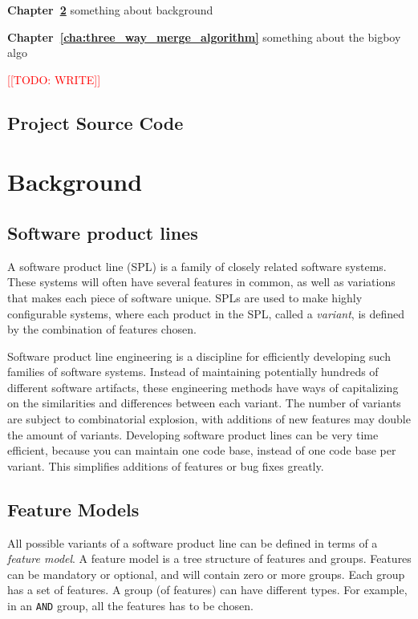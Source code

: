 \documentclass[a4paper,english]{ifimaster}
\newcommand{\todo}[1]{\textcolor{red}{[[TODO: #1]]}\PackageWarning{TODO:}{#1!}}
\begin{document}
\textbf{Chapter~\ref{cha:background}} something about background

\textbf{Chapter~\ref{cha:three_way_merge_algorithm}} something about the bigboy algo

\todo{WRITE}

\section{Project Source Code}%
\label{sec:project_source_code}

\chapter{Background}%
\label{cha:background}

\section{Software product lines}%
\label{sec:software_product_lines}

A software product line (SPL) is a family of closely related software systems. These systems will often have several features in common, as well as variations that makes each piece of software unique. SPLs are used to make highly configurable systems, where each product in the SPL, called a \textit{variant}, is defined by the combination of features chosen.

Software product line engineering is a discipline for efficiently developing such families of software systems. Instead of maintaining potentially hundreds of different software artifacts, these engineering methods have ways of capitalizing on the similarities and differences between each variant. The number of variants are subject to combinatorial explosion, with additions of new features may double the amount of variants. Developing software product lines can be very time efficient, because you can maintain one code base, instead of one code base per variant. This simplifies additions of features or bug fixes greatly.

\section{Feature Models}%
\label{sec:feature_models}

All possible variants of a software product line can be defined in terms of a \textit{feature model}. A feature model is a tree structure of features and groups. Features can be mandatory or optional, and will contain zero or more groups. Each group has a set of features. A group (of features) can have different types. For example, in an \texttt{AND} group, all the features has to be chosen.
\end{document}
